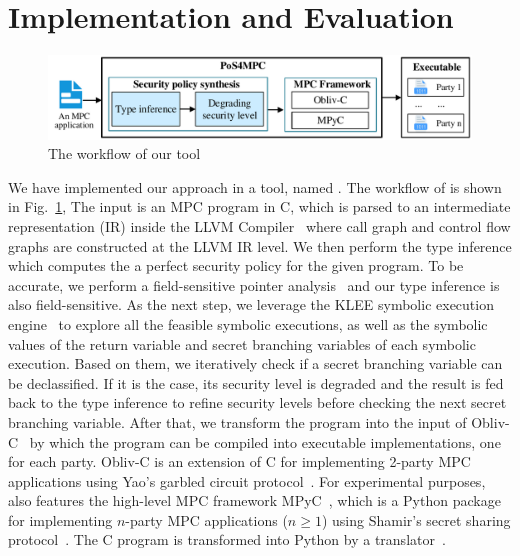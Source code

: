 \section{Implementation and Evaluation}\label{sec:implementation}
\begin{figure}[t]
	\centering
	\includegraphics[scale=0.56]{img/workflow-v1}
	\vspace{-2mm}
	\caption{The workflow of our tool \TNAME}
	\label{fig-impl}
	\vspace{-3mm}
\end{figure}
We have implemented our approach in a tool, named \TNAME. The workflow of \TNAME is shown in Fig.~\ref{fig-impl},
The input is an MPC program in C, which is parsed %
to an intermediate representation (IR)
inside the LLVM Compiler~\cite{llvm} where call graph and control flow graphs are constructed %
at the LLVM IR level.
We then perform the type inference which computes
the a perfect security policy for the given program.
To be accurate, we perform a field-sensitive pointer
analysis~\cite{BalatsourasS16} and our type inference is also field-sensitive.
As the next step, we leverage the KLEE symbolic execution engine~\cite{CadarDE08}
to explore all the feasible symbolic executions, as well as the symbolic
values of the return variable and secret branching variables of each symbolic execution.
Based on them, we iteratively check if a secret branching variable %
can be declassified.  %
If it is the case, its security level %
is degraded and the result is fed back to the type inference to refine security levels before checking the next secret branching variable.
After that, we transform the program into the input of Obliv-C~\cite{ZahurE15} by which the program can be compiled into
executable implementations, one for each party. Obliv-C is an extension of C for implementing 2-party MPC applications using Yao's garbled circuit protocol~\cite{yao82}.
For experimental purposes, \TNAME also features the high-level MPC framework MPyC~\cite{MPyC20},
which is a Python package for implementing $n$-party MPC applications ($n\geq 1$) using Shamir's secret sharing protocol~\cite{Shamir79}.
The C program is transformed into Python by a translator~\cite{C2Python}.


